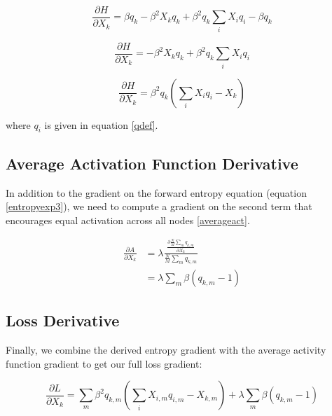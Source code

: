 \begin{displaymath}
    \frac{\partial H}{\partial X_{k}} = \beta q_{k} - \beta^{2} X_{k} q_{k} + \beta^{2} q_{k} \sum_{i}X_{i}q_{i} - \beta q_{k}
\end{displaymath}

\begin{displaymath}
    \frac{\partial H}{\partial X_{k}} = - \beta^{2}X_{k}q_{k} + \beta^{2}q_{k}\sum_{i}X_{i}q_{i}
\end{displaymath}

\begin{equation}
    \frac{\partial H}{\partial X_{k}} = \beta^{2}q_{k}\left(\sum_{i}X_{i}q_{i} - X_{k}\right)
\label{combd}
\end{equation}

\noindent where $q_{i}$ is given in equation \ref{qdef}.

\subsection{Average Activation Function Derivative}

\noindent In addition to the gradient on the forward entropy equation (equation \ref{entropyexp3}), we need to compute a gradient on the second term that encourages equal activation across all nodes \ref{averageact}.

\begin{equation}
\begin{aligned}
    \frac{\partial A}{\partial X_{k}} &= \lambda \frac{\frac{\partial \frac{N}{M}\sum_{m}q_{k,m}}{\partial X_{k}}}{\frac{N}{M} \sum_{m}q_{k,m}}\\
                                      &= \lambda \sum_{m} \beta \left(q_{k,m} - 1\right)
\label{averageactderiv}
\end{aligned}
\end{equation}

\subsection{Loss Derivative}
\noindent Finally, we combine the derived entropy gradient with the average activity function gradient to get our full loss gradient:

\begin{equation}
    \frac{\partial L}{\partial X_{k}} = \sum_{m} \beta^{2}q_{k,m}\left(\sum_{i}X_{i,m}q_{i,m} - X_{k,m}\right) + \lambda \sum_{m} \beta \left(q_{k,m} - 1\right)
\label{lossgrad}
\end{equation}




